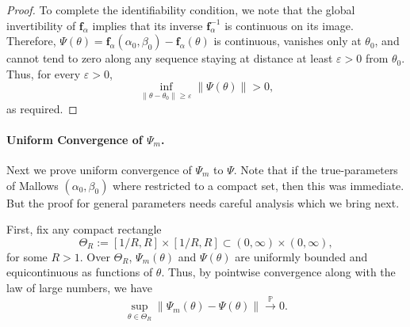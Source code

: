 \documentclass{article}
\renewcommand{\P}{\mathbb{P}}
\newtheorem{lemma}[theorem]{Lemma}     %
\begin{document}
\begin{proof}
To complete the identifiability condition, we note that the global invertibility of \(\boldsymbol{f}_\alpha\) implies that its inverse \(\boldsymbol{f}_\alpha^{-1}\) is continuous on its image. Therefore, \(\Psi(\theta) = \boldsymbol{f}_\alpha(\alpha_0, \beta_0) - \boldsymbol{f}_\alpha(\theta)\) is continuous, vanishes only at \(\theta_0\), and cannot tend to zero along any sequence staying at distance at least \(\varepsilon > 0\) from \(\theta_0\). Thus, for every \(\varepsilon > 0\),
\[
\inf_{\|\theta - \theta_0\| \ge \varepsilon} \|\Psi(\theta)\| > 0,
\]
as required.
\end{proof}

\medskip
\paragraph{Uniform Convergence of $\Psi_m$.}
Next we prove uniform convergence of $\Psi_m$ to $\Psi$. Note that if the true-parameters of Mallows $(\alpha_0,\beta_0)$ where restricted to a compact set, then this was immediate. But the proof for general parameters needs careful analysis which we bring next.

First, fix any compact rectangle
\[
\Theta_R := [1/R, R] \times [1/R, R] \subset (0,\infty)\times(0,\infty),
\]
for some \(R>1\).
Over \(\Theta_R\), \(\Psi_m(\theta)\) and \(\Psi(\theta)\) are uniformly bounded and equicontinuous as functions of \(\theta\). 
Thus, by pointwise convergence along with the law of large numbers, we have
\[
\sup_{\theta\in\Theta_R} \|\Psi_m(\theta) - \Psi(\theta)\| \xrightarrow{\P} 0.
\]
\end{document}
